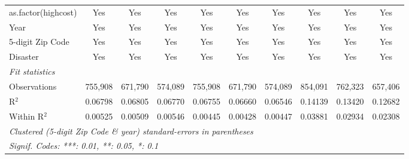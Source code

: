 \begin{tabular}{lccccccccc}
   as.factor(highcost)                                        & Yes            & Yes            & Yes           & Yes           & Yes           & Yes          & Yes           & Yes            & Yes\\  
   Year                                                       & Yes            & Yes            & Yes           & Yes           & Yes           & Yes          & Yes           & Yes            & Yes\\  
   5-digit Zip Code                                           & Yes            & Yes            & Yes           & Yes           & Yes           & Yes          & Yes           & Yes            & Yes\\  
   Disaster                                                   & Yes            & Yes            & Yes           & Yes           & Yes           & Yes          & Yes           & Yes            & Yes\\  
   \midrule
   \emph{Fit statistics}\\
   Observations                                               & 755,908        & 671,790        & 574,089       & 755,908       & 671,790       & 574,089      & 854,091       & 762,323        & 657,406\\  
   R$^2$                                                      & 0.06798        & 0.06805        & 0.06770       & 0.06755       & 0.06660       & 0.06546      & 0.14139       & 0.13420        & 0.12682\\  
   Within R$^2$                                               & 0.00525        & 0.00509        & 0.00546       & 0.00445       & 0.00428       & 0.00447      & 0.03881       & 0.02934        & 0.02308\\  
   \midrule \midrule
   \multicolumn{10}{l}{\emph{Clustered (5-digit Zip Code \& year) standard-errors in parentheses}}\\
   \multicolumn{10}{l}{\emph{Signif. Codes: ***: 0.01, **: 0.05, *: 0.1}}\\
\end{tabular}
\par\endgroup
